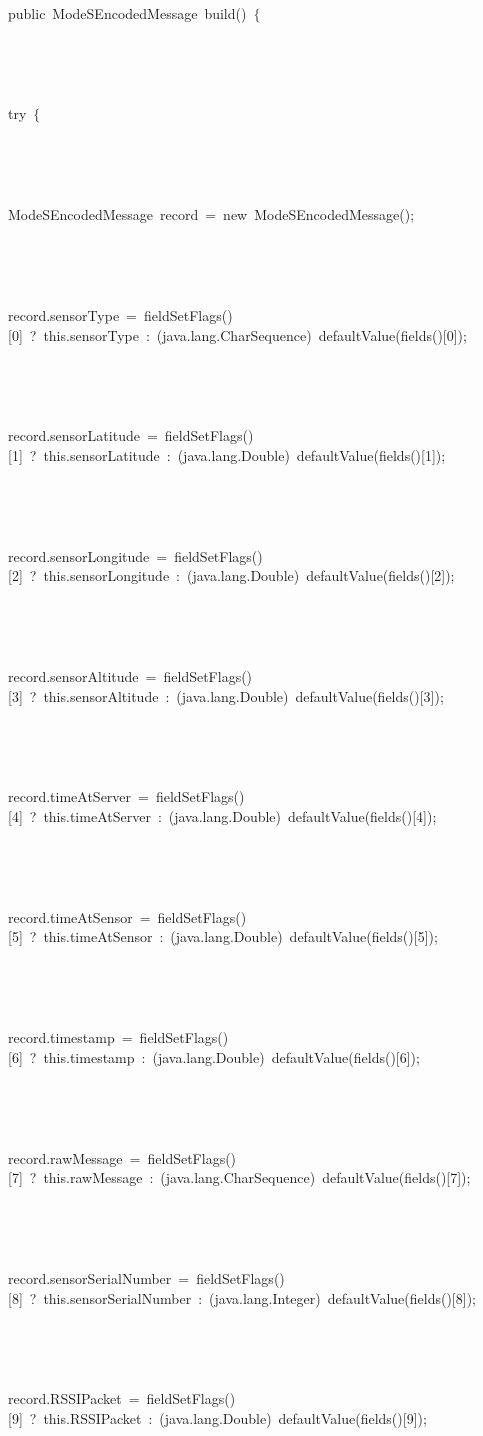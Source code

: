 {{{\ }}{\hlstd\ \ \ \ }{\hlstd public\ ModeSEncodedMessage\ build()\ $\{$\leavevmode\par
{\ }}{\hlstd\ \ \ \ \ \ }{\hlstd try\ $\{$\leavevmode\par
{\ }}{\hlstd\ \ \ \ \ \ \ \ }{\hlstd ModeSEncodedMessage\ record\ $\mathord{=}$\ new\ ModeSEncodedMessage();\leavevmode\par
{\ }}{\hlstd\ \ \ \ \ \ \ \ }{\hlstd record.sensorType\ $\mathord{=}$\ fieldSetFlags()[0]\ ?\ this.sensorType\ :\ (java.lang.CharSequence)\ defaultValue(fields()[0]);\leavevmode\par
{\ }}{\hlstd\ \ \ \ \ \ \ \ }{\hlstd record.sensorLatitude\ $\mathord{=}$\ fieldSetFlags()[1]\ ?\ this.sensorLatitude\ :\ (java.lang.Double)\ defaultValue(fields()[1]);\leavevmode\par
{\ }}{\hlstd\ \ \ \ \ \ \ \ }{\hlstd record.sensorLongitude\ $\mathord{=}$\ fieldSetFlags()[2]\ ?\ this.sensorLongitude\ :\ (java.lang.Double)\ defaultValue(fields()[2]);\leavevmode\par
{\ }}{\hlstd\ \ \ \ \ \ \ \ }{\hlstd record.sensorAltitude\ $\mathord{=}$\ fieldSetFlags()[3]\ ?\ this.sensorAltitude\ :\ (java.lang.Double)\ defaultValue(fields()[3]);\leavevmode\par
{\ }}{\hlstd\ \ \ \ \ \ \ \ }{\hlstd record.timeAtServer\ $\mathord{=}$\ fieldSetFlags()[4]\ ?\ this.timeAtServer\ :\ (java.lang.Double)\ defaultValue(fields()[4]);\leavevmode\par
{\ }}{\hlstd\ \ \ \ \ \ \ \ }{\hlstd record.timeAtSensor\ $\mathord{=}$\ fieldSetFlags()[5]\ ?\ this.timeAtSensor\ :\ (java.lang.Double)\ defaultValue(fields()[5]);\leavevmode\par
{\ }}{\hlstd\ \ \ \ \ \ \ \ }{\hlstd record.timestamp\ $\mathord{=}$\ fieldSetFlags()[6]\ ?\ this.timestamp\ :\ (java.lang.Double)\ defaultValue(fields()[6]);\leavevmode\par
{\ }}{\hlstd\ \ \ \ \ \ \ \ }{\hlstd record.rawMessage\ $\mathord{=}$\ fieldSetFlags()[7]\ ?\ this.rawMessage\ :\ (java.lang.CharSequence)\ defaultValue(fields()[7]);\leavevmode\par
{\ }}{\hlstd\ \ \ \ \ \ \ \ }{\hlstd record.sensorSerialNumber\ $\mathord{=}$\ fieldSetFlags()[8]\ ?\ this.sensorSerialNumber\ :\ (java.lang.Integer)\ defaultValue(fields()[8]);\leavevmode\par
{\ }}{\hlstd\ \ \ \ \ \ \ \ }{\hlstd record.RSSIPacket\ $\mathord{=}$\ fieldSetFlags()[9]\ ?\ this.RSSIPacket\ :\ (java.lang.Double)\ defaultValue(fields()[9]);\leavevmode\par
}}
